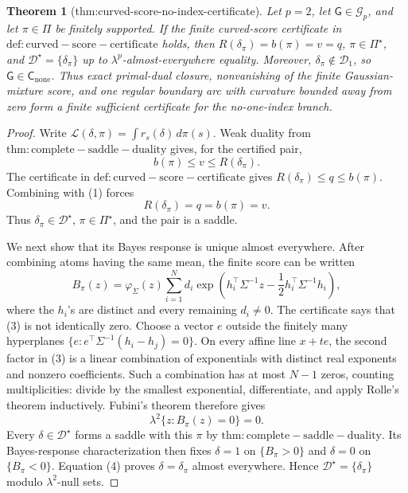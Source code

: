 \documentclass{article}
\newtheorem{theorem}{Theorem}
\begin{document}
\begin{theorem}[thm:curved-score-no-index-certificate]\label{thm:curved-score-no-index-certificate}
Let \(p=2\), let \(\mathsf G\in\mathcal G_p\), and let \(\pi\in\Pi\) be finitely supported. If the finite curved-score certificate in \(\mathrm{def:curved-score-certificate}\) holds, then \(R(\delta_{\pi})=b(\pi)=v=q\), \(\pi\in\Pi^{\star}\), and \(\mathcal D^{\star}=\{\delta_{\pi}\}\) up to \(\lambda^p\)-almost-everywhere equality. Moreover, \(\delta_{\pi}\notin\mathcal D_1\), so \(\mathsf G\in\mathsf C_{\mathrm{none}}\). Thus exact primal-dual closure, nonvanishing of the finite Gaussian-mixture score, and one regular boundary arc with curvature bounded away from zero form a finite sufficient certificate for the no-one-index branch.
\end{theorem}
\begin{proof}
Write \(\mathcal L(\delta,\pi)=\int r_s(\delta)\,d\pi(s)\). Weak duality from \(\mathrm{thm:complete-saddle-duality}\) gives, for the certified pair,
\[
 b(\pi)\leq v\leq R(\delta_{\pi}). \tag{1}
\]
The certificate in \(\mathrm{def:curved-score-certificate}\) gives
\(R(\delta_{\pi})\leq q\leq b(\pi)\). Combining with (1) forces
\[
 R(\delta_{\pi})=q=b(\pi)=v. \tag{2}
\]
Thus \(\delta_{\pi}\in\mathcal D^{\star}\), \(\pi\in\Pi^{\star}\), and the pair is a saddle.

We next show that its Bayes response is unique almost everywhere. After combining atoms having the same mean, the finite score can be written
\[
 B_{\pi}(z)=\varphi_{\Sigma}(z)
 \sum_{i=1}^N d_i
 \exp\!\left(h_i^{\top}\Sigma^{-1}z-\frac12h_i^{\top}\Sigma^{-1}h_i\right), \tag{3}
\]
where the \(h_i\)'s are distinct and every remaining \(d_i\neq0\). The certificate says that (3) is not identically zero. Choose a vector \(e\) outside the finitely many hyperplanes
\(\{e:e^{\top}\Sigma^{-1}(h_i-h_j)=0\}\). On every affine line \(x+te\), the second factor in (3) is a linear combination of exponentials with distinct real exponents and nonzero coefficients. Such a combination has at most \(N-1\) zeros, counting multiplicities: divide by the smallest exponential, differentiate, and apply Rolle's theorem inductively. Fubini's theorem therefore gives
\[
 \lambda^2\{z:B_{\pi}(z)=0\}=0. \tag{4}
\]
Every \(\delta\in\mathcal D^{\star}\) forms a saddle with this \(\pi\) by \(\mathrm{thm:complete-saddle-duality}\). Its Bayes-response characterization then fixes \(\delta=1\) on \(\{B_{\pi}>0\}\) and \(\delta=0\) on \(\{B_{\pi}<0\}\). Equation (4) proves \(\delta=\delta_{\pi}\) almost everywhere. Hence \(\mathcal D^{\star}=\{\delta_{\pi}\}\) modulo \(\lambda^2\)-null sets.


\end{proof}
\end{document}
